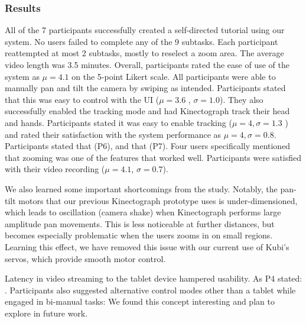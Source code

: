 \subsubsection{Results}
All of the 7 participants successfully created a self-directed tutorial using our system. No users failed to complete any of the 9 subtasks. Each participant reattempted at most 2 subtasks, mostly to reselect a zoom area. The average video length was 3.5 minutes. Overall, participants rated the ease of use of the system as $\mu=4.1$ on the 5-point Likert scale.
%
All participants were able to manually pan and tilt the camera by swiping as intended. Participants stated that this was easy to control with the UI ($\mu=3.6$ , $\sigma = 1.0$). They also successfully enabled the tracking mode and had Kinectograph track their head and hands. Participants stated it was easy to enable tracking ($\mu=4, \sigma=1.3$ ) and rated their satisfaction with the system performance as $\mu=4, \sigma=0.8$.  Participants stated that  (P6), and that  (P7). Four users specifically mentioned that zooming was one of the features that worked well. Participants were satisfied with their video recording ($\mu=4.1$, $\sigma=0.7$).

We also learned some important shortcomings from the study. Notably, the pan-tilt motors that our previous Kinectograph prototype uses is under-dimensioned, which leads to oscillation (camera shake) when Kinectograph performs large amplitude pan movements. This is less noticeable at further distances, but becomes especially problematic when the users zooms in on small regions. Learning this effect, we have removed this issue with our current use of Kubi's servos, which provide smooth motor control.

Latency in video streaming to the tablet device hampered usability. As P4 stated: .
%
%
Participants also suggested alternative control modes other than a tablet while engaged in bi-manual tasks:  We found this concept interesting and plan to explore in future work.

